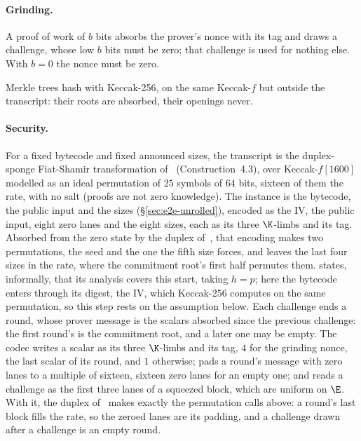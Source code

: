\paragraph{Grinding.} A proof of work of $b$ bits absorbs the prover's nonce with its tag and draws a challenge, whose low $b$ bits must be zero; that challenge is used for nothing else. With $b=0$ the nonce must be zero.

Merkle trees hash with Keccak-256, on the same Keccak-$f$ but outside the transcript: their roots are absorbed, their openings never.

\paragraph{Security.} For a fixed bytecode and fixed announced sizes, the transcript is the duplex-sponge Fiat-Shamir transformation of~\cite{CO25} (Construction~4.3), over Keccak-$f[1600]$ modelled as an ideal permutation of $25$ symbols of $64$ bits, sixteen of them the rate, with no salt (proofs are not zero knowledge). The instance is the bytecode, the public input and the sizes (\S\ref{sec:e2e-unrolled}), encoded as the IV, the public input, eight zero lanes and the eight sizes, each as its three $\K$-limbs and its tag. Absorbed from the zero state by the duplex of~\cite[Construction~3.3]{CO25}, that encoding makes two permutations, the seed and the one the fifth size forces, and leaves the last four sizes in the rate, where the commitment root's first half permutes them. \cite[\S2.2]{CO25} states, informally, that its analysis covers this start, taking $h=p$; here the bytecode enters through its digest, the IV, which Keccak-256 computes on the same permutation, so this step rests on the assumption below. Each challenge ends a round, whose prover message is the scalars absorbed since the previous challenge: the first round's is the commitment root, and a later one may be empty. The codec writes a scalar as its three $\K$-limbs and its tag, $4$ for the grinding nonce, the last scalar of its round, and $1$ otherwise; pads a round's message with zero lanes to a multiple of sixteen, sixteen zero lanes for an empty one; and reads a challenge as the first three lanes of a squeezed block, which are uniform on $\E$. With it, the duplex of~\cite[Construction~3.3]{CO25} makes exactly the permutation calls above: a round's last block fills the rate, so the zeroed lanes are its padding, and a challenge drawn after a challenge is an empty round.

